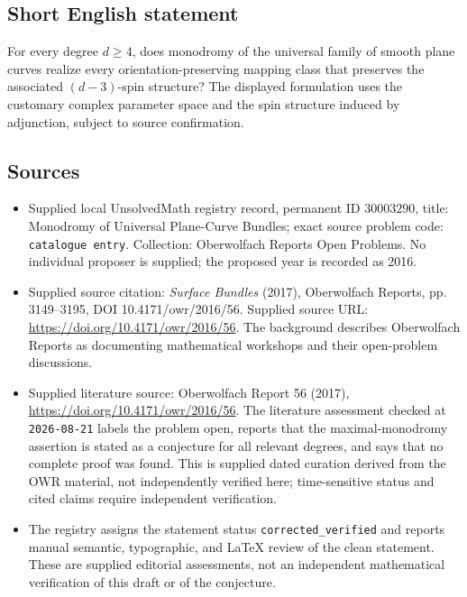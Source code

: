\documentclass[11pt]{article}
\begin{document}
\subsection{Short English statement}
For every degree \(d\geq 4\), does monodromy of the universal family of smooth plane curves realize every orientation-preserving mapping class that preserves the associated \((d-3)\)-spin structure? The displayed formulation uses the customary complex parameter space and the spin structure induced by adjunction, subject to source confirmation.
\subsection{Sources}
\begin{itemize}
\item Supplied local UnsolvedMath registry record, permanent ID \(30003290\), title: Monodromy of Universal Plane-Curve Bundles; exact source problem code: \texttt{catalogue entry}. Collection: Oberwolfach Reports Open Problems. No individual proposer is supplied; the proposed year is recorded as 2016.
\item Supplied source citation: \emph{Surface Bundles} (2017), Oberwolfach Reports, pp. 3149--3195, DOI 10.4171/owr/2016/56. Supplied source URL: \url{https://doi.org/10.4171/owr/2016/56}. The background describes Oberwolfach Reports as documenting mathematical workshops and their open-problem discussions.
\item Supplied literature source: Oberwolfach Report 56 (2017), \url{https://doi.org/10.4171/owr/2016/56}. The literature assessment checked at \texttt{2026-08-21} labels the problem open, reports that the maximal-monodromy assertion is stated as a conjecture for all relevant degrees, and says that no complete proof was found. This is supplied dated curation derived from the OWR material, not independently verified here; time-sensitive status and cited claims require independent verification.
\item The registry assigns the statement status \texttt{corrected\_verified} and reports manual semantic, typographic, and LaTeX review of the clean statement. These are supplied editorial assessments, not an independent mathematical verification of this draft or of the conjecture.
\end{itemize}
\end{document}
